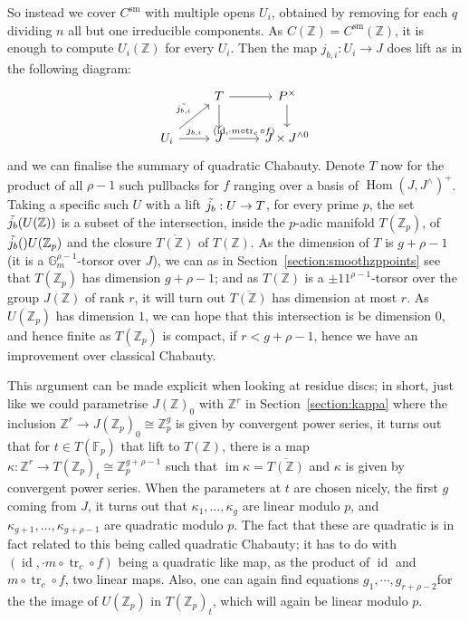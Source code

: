 \documentclass[12pt]{article}
\newcommand{\Z}{\mathbb{Z}}
\renewcommand{\G}{\mathbb{G}}
\newcommand{\F}{\mathbb{F}}
\DeclareMathOperator{\Hom}{Hom}
\DeclareMathOperator{\im}{im}
\DeclareMathOperator{\id}{id}
\DeclareMathOperator{\tr}{tr}
\DeclareMathOperator{\sm}{sm}
\theoremstyle{plain}
\theoremstyle{definition}
\theoremstyle{remark}
\begin{document}
So instead we cover $C^{\sm}$ with multiple opens $U_i$, obtained by removing for each $q$ dividing $n$ all but one irreducible components. As $C(\Z) = C^{\sm}(\Z)$, it is enough to compute $U_i(\Z)$ for every $U_i$. Then the map $j_{b,i}: U_i \to J$ does lift as in the following diagram:
\[\begin{tikzcd} %
                                                & T \arrow[d] \arrow[r]                   & P^\times \arrow[d]      \\
U_i \arrow[ru, "\Tilde{j_{b,i}}"] \arrow[r, "j_{b,i}"] & J \arrow[r, "{(\id,\cdot m \circ\tr_c \circ f)}"] & J \times J^{\wedge 0}
\end{tikzcd}\]
and we can finalise the summary of quadratic Chabauty. Denote $T$ now for the product of all $\rho-1$ such pullbacks for $f$ ranging over a basis of $\Hom(J,J^{\wedge})^+$. Taking a specific such $U$ with a lift $\Tilde{j_b}: U \to T$, for every prime $p$, the set $\Tilde{j_{b}}(U(\Z))$ is a subset of the intersection, inside the $p$-adic manifold $T(\Z_p)$, of $\Tilde{j_b}()U(\Z_p)$ and the closure $\overline{T(\Z)}$ of $T(\Z)$. As the dimension of $T$ is $g+\rho-1$ (it is a $\G_m^{\rho-1}$-torsor over $J$), we can as in Section~\ref{section:smoothzppoints} see that $T(\Z_p)$ has dimension $g+\rho-1$; and as $T(\Z)$ is a ${\pm 11}^{\rho-1}$-torsor over the group $J(\Z)$ of rank $r$, it will turn out $\overline{T(\Z)}$ has dimension at most $r$. As $U(\Z_p)$ has dimension $1$, we can hope that this intersection is be dimension $0$, and hence finite as $T(\Z_p)$ is compact, if $r < g + \rho-1$, hence we have an improvement over classical Chabauty.

This argument can be made explicit when looking at residue discs; in short, just like we could parametrise $J(\Z)_0$ with $\Z^r$ in Section~\ref{section:kappa} where the inclusion $\Z^r \to J(\Z_p)_0 \cong \Z_p^{g}$ is given by convergent power series, it turns out that for $t \in T(\F_p)$ that lift to $T(\Z)$, there is a map $\kappa: \Z^r \to T(\Z_p)_t \cong \Z_p^{g+\rho-1}$ such that $\im \kappa = \overline{T(\Z)}$ and $\kappa$ is given by convergent power series. When the parameters at $t$ are chosen nicely, the first $g$ coming from $J$, it turns out that $\kappa_1,\dots,\kappa_g$ are linear modulo $p$, and $\kappa_{g+1},\dots,\kappa_{g+\rho-1}$ are quadratic modulo $p$. The fact that these are quadratic is in fact related to this being called quadratic Chabauty; it has to do with $(\id,\cdot m \circ\tr_c \circ f)$ being a quadratic like map, as the product of $\id$ and $m \circ\tr_c \circ f$, two linear maps. Also, one can again find equations $g_1,\cdots,g_{r+\rho-2}$for the the image of $U(\Z_p)$ in $T(\Z_p)_t$, which will again be linear modulo $p$.
\end{document}
